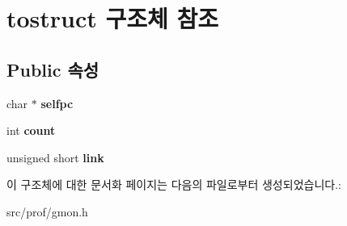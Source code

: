\hypertarget{structtostruct}{}\section{tostruct 구조체 참조}
\label{structtostruct}
\subsection*{Public 속성}
\begin{DoxyCompactItemize}
\item 
\mbox{\label{structtostruct_a0d2bae308211046a2b1c36b85f611044}} 
char $\ast$ {\bfseries selfpc}
\item 
\mbox{\label{structtostruct_adeb5d86711902c1a49e2de64dc1704b7}} 
int {\bfseries count}
\item 
\mbox{\label{structtostruct_a69307956aeadd440e3bc426e1ca7ce9c}} 
unsigned short {\bfseries link}
\end{DoxyCompactItemize}


이 구조체에 대한 문서화 페이지는 다음의 파일로부터 생성되었습니다.\+:\begin{DoxyCompactItemize}
\item 
src/prof/gmon.\+h\end{DoxyCompactItemize}
